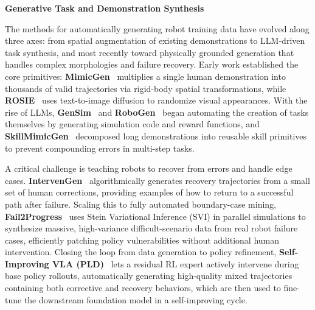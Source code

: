 \documentclass[acmsmall,screen,review,anonymous]{acmart}
\begin{document}
\textbf{Generative Task and Demonstration Synthesis}

The methods for automatically generating robot training data have evolved along three axes: from spatial augmentation of existing demonstrations to LLM-driven task synthesis, and most recently toward physically grounded generation that handles complex morphologies and failure recovery. Early work established the core primitives: \textbf{MimicGen}~\cite{mandlekar2023mimicgen} multiplies a single human demonstration into thousands of valid trajectories via rigid-body spatial transformations, while \textbf{ROSIE}~\cite{yu2023scalingrobotlearningsemantically} uses text-to-image diffusion to randomize visual appearances. With the rise of LLMs, \textbf{GenSim}~\cite{wang2024gensim} and \textbf{RoboGen}~\cite{wang2023robogen} began automating the creation of tasks themselves by generating simulation code and reward functions, and \textbf{SkillMimicGen}~\cite{garrett2024skillmimicgen} decomposed long demonstrations into reusable skill primitives to prevent compounding errors in multi-step tasks.

A critical challenge is teaching robots to recover from errors and handle edge cases. \textbf{IntervenGen}~\cite{hoque2024intervengen} algorithmically generates recovery trajectories from a small set of human corrections, providing examples of how to return to a successful path after failure. Scaling this to fully automated boundary-case mining, \textbf{Fail2Progress}~\cite{huang2025fail2progress} uses Stein Variational Inference (SVI) in parallel simulations to synthesize massive, high-variance difficult-scenario data from real robot failure cases, efficiently patching policy vulnerabilities without additional human intervention. Closing the loop from data generation to policy refinement, \textbf{Self-Improving VLA (PLD)}~\cite{xiao2025selfimprovingvla} lets a residual RL expert actively intervene during base policy rollouts, automatically generating high-quality mixed trajectories containing both corrective and recovery behaviors, which are then used to fine-tune the downstream foundation model in a self-improving cycle.
\end{document}
